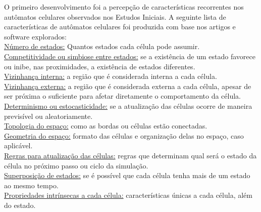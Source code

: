 \documentclass[
	12pt,				%
	openright,			%
	twoside,			%
	a4paper,			%
	english,			%
	french,				%
	spanish,			%
	brazil				%
	]{abntex2}
\begin{document}
O primeiro desenvolvimento foi a percepção de características recorrentes nos autômatos celulares observados nos Estudos Iniciais.
A seguinte lista de características de autômatos celulares foi produzida com base nos artigos e software explorados:\\
\underline{Número de estados:} Quantos estados cada célula pode assumir.\\
\underline{Competitividade ou simbiose entre estados:} se a existência de um estado favorece ou inibe, nas proximidades, a existência de estados diferentes.\\
\underline{Vizinhança interna:} a região que é considerada interna a cada célula.\\
\underline{Vizinhança externa:} a região que é considerada externa a cada célula, apesar de ser próxima o suficiente para afetar diretamente o comportamento da célula.\\
\underline{Determinismo ou estocasticidade:} se a atualização das células ocorre de maneira previsível ou aleatoriamente.\\
\underline{Topologia do espaço:} como as bordas ou células estão conectadas.\\
\underline{Geometria do espaço:} formato das células e organização delas no espaço, caso aplicável.\\
\underline{Regras para atualização das células:} regras que determinam qual será o estado da célula no próximo passo ou ciclo da simulação.\\
\underline{Superposição de estados:} se é possível que cada célula tenha mais de um estado ao mesmo tempo.\\
\underline{Propriedades intrínsecas a cada célula:} características únicas a cada célula, além do estado.
\end{document}
